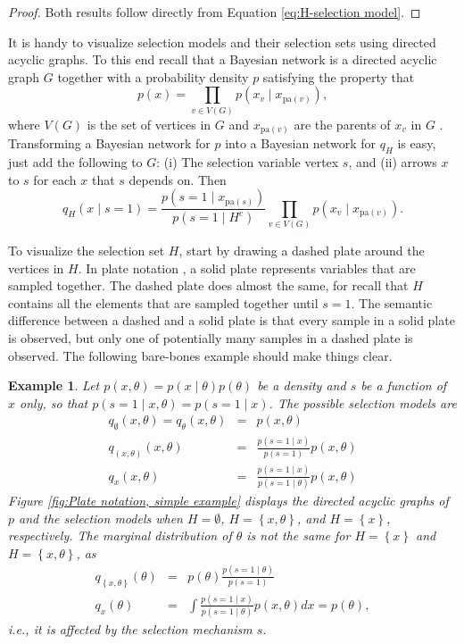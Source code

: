 \documentclass[useAMS,usenatbib,referee]{biom}
\newtheorem{exampl}[theorem]{Example}
\begin{document}
\begin{proof}
Both results follow directly from Equation \eqref{eq:H-selection model}.
\end{proof}

It is handy to visualize selection models and their selection sets using directed acyclic graphs. To this end recall that a Bayesian network is a directed acyclic graph $G$ together with a probability
density $p$ satisfying the property that $$p(x)=\prod_{v\in V(G)}p(x_{v}\mid x_{\textrm{pa}(v)}),$$ where $V(G)$ is the set of vertices in $G$ and $x_{\textrm{pa}(v)}$ are the parents of $x_{v}$ in $G$ \citep{Pearl2014}.
Transforming a Bayesian network for $p$ into a Bayesian network for $q_{H}$ is easy, just add the following to $G$: (i) The selection variable vertex $s$, and (ii) arrows $x$ to $s$ for each $x$ that $s$ depends on. Then
\begin{equation}
q_{H}(x\mid s=1)=\frac{p(s=1\mid x_{\textrm{pa}(s)})}{p(s=1\mid H^{c})}\prod_{v\in V(G)}p(x_{v}\mid x_{\textrm{pa}(v)})\label{eq:DAG, selection model}.
\end{equation}

To visualize the selection set $H$, start by drawing a dashed plate around the vertices in $H$. In plate notation \citep{buntine1994operations}, a solid plate represents variables that are sampled together. The
dashed plate does almost the same, for recall that $H$ contains all the elements that are sampled together until $s=1$. The semantic difference between a dashed and a solid plate is that every sample in a solid plate is observed, but only one of potentially many samples in a dashed plate is observed. The following bare-bones example should make things clear.
\begin{exampl}\label{exa:Marginal density of theta}
Let $p(x,\theta)=p(x\mid\theta)p(\theta)$
be a density and $s$ be a function of $x$ only, so that $p(s=1\mid x,\theta)=p(s=1\mid x)$.
The possible selection models are
\begin{eqnarray*}
q_{\emptyset}(x,\theta) = q_{\theta}(x,\theta) & = & p(x,\theta)\\
q_{(x,\theta)}(x,\theta) & = & \frac{p(s=1\mid x)}{p(s=1)}p(x,\theta)\\
q_{x}(x,\theta) & = & \frac{p(s=1\mid x)}{p(s=1\mid\theta)}p(x,\theta)
\end{eqnarray*}
Figure \ref{fig:Plate notation, simple example} displays the directed acyclic graphs of $p$ and the selection models when $H = \emptyset$, $H=\left\{ x,\theta\right\}$, and $H=\left\{ x\right\}$, respectively. The marginal distribution of $\theta$ is not the same for $H=\left\{ x\right\}$ and $H=\left\{ x,\theta\right\} $, as
\begin{eqnarray*}
q_{\left\{ x,\theta\right\} }(\theta) & = & p(\theta)\frac{p(s=1\mid\theta)}{p(s=1)}\\
q_{x}(\theta) & = & \int\frac{p(s=1\mid x)}{p(s=1\mid\theta)}p(x,\theta)dx=p(\theta),
\end{eqnarray*}
i.e., it is affected by the selection mechanism $s$.
\end{exampl}
\end{document}
